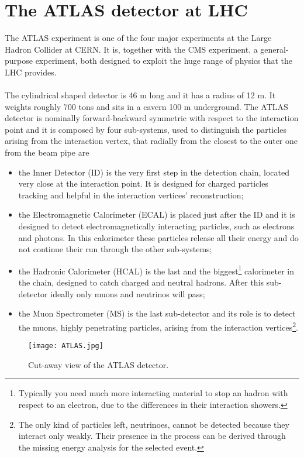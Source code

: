 \chapter{The ATLAS detector at LHC}
\label{capitolo_3}
The ATLAS experiment\cite{Collaboration_2008} is one of the four major experiments at the Large Hadron Collider at CERN. It is, together with the CMS experiment, a general-purpose experiment, both designed to exploit the huge range of physics that the LHC provides.
\\\\
The cylindrical shaped detector is 46 m long and it has a radius of 12 m. It weights roughly 700 tons and sits in a cavern 100 m underground. The ATLAS detector is nominally forward-backward symmetric with respect to the interaction point and it is composed by four sub-systems, used to distinguish the particles arising from the interaction vertex, that radially from the closest to the outer one from the beam pipe are
\begin{itemize}
\item the Inner Detector (ID) is the very first step in the detection chain, located very close at the interaction point. It is designed for charged particles tracking and helpful in the interaction vertices' reconstruction;
\item the Electromagnetic Calorimeter (ECAL) is placed just after the ID and it is designed to detect electromagnetically interacting particles, such as electrons and photons. In this calorimeter these particles release all their energy and do not continue their run through the other sub-systems;
\item the Hadronic Calorimeter (HCAL) is the last and the biggest\footnote{Typically you need much more interacting material to stop an hadron with respect to an electron, due to the differences in their interaction showers.} 
calorimeter in the chain, designed to catch charged and neutral hadrons. After this sub-detector ideally only muons and neutrinos will pass;
\item the Muon Spectrometer (MS) is the last sub-detector and its role is to detect the muons, highly penetrating particles, arising from the interaction vertices\footnote{The only kind of particles left, neutrinoes, cannot be detected because they interact only weakly. Their presence in the process can be derived through the missing energy analysis for the selected event.}.
\end{itemize}
\begin{figure}[h]
\centering
\texttt{[image: ATLAS.jpg]}
\caption{Cut-away view of the ATLAS detector.}
\end{figure}
